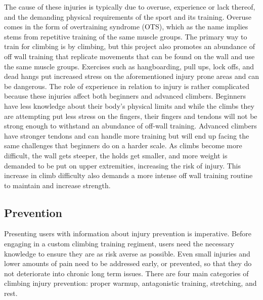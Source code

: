 \documentclass[10pt,twocolumn]{article}
\begin{document}
	The cause of these injuries is typically due to overuse, experience or lack thereof, and the demanding physical requirements of the sport and its training. Overuse comes in the form of overtraining syndrome (OTS), which as the name implies stems from repetitive training of the same muscle groups. The primary way to train for climbing is by climbing, but this project also promotes an abundance of off wall training that replicate movements that can be found on the wall and use the same muscle groups. Exercises such as hangboarding, pull ups, lock offs, and dead hangs put increased stress on the aforementioned injury prone areas and can be dangerous. The role of experience in relation to injury is rather complicated because these injuries affect both beginners and advanced climbers. Beginners have less knowledge about their body’s physical limits and while the climbs they are attempting put less stress on the fingers, their fingers and tendons will not be strong enough to withstand an abundance of off-wall training. Advanced climbers have stronger tendons and can handle more training but will end up facing the same challenges that beginners do on a harder scale. As climbs become more difficult, the wall gets steeper, the holds get smaller, and more weight is demanded to be put on upper extremities, increasing the risk of injury. This increase in climb difficulty also demands a more intense off wall training routine to maintain and increase strength. \cite{meyers_rock_nodate}

\subsection{Prevention}

    Presenting users with information about injury prevention is imperative. Before engaging in a custom climbing training regiment, users need the necessary knowledge to ensure they are as risk averse as possible. Even small injuries and lower amounts of pain need to be addressed early, or prevented, so that they do not deteriorate into chronic long term issues. There are four main categories of climbing injury prevention: proper warmup, antagonistic training, stretching, and rest. 
\end{document}
